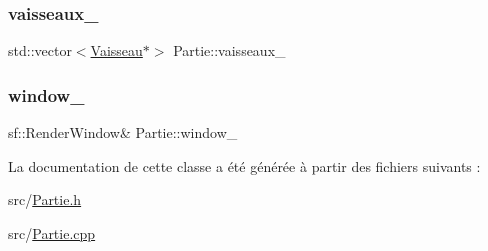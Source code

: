 \subsubsection{\texorpdfstring{vaisseaux\+\_\+}{vaisseaux\_}}
{\footnotesize\ttfamily std\+::vector$<$\hyperlink{class_vaisseau}{Vaisseau}$\ast$$>$ Partie\+::vaisseaux\+\_\+\hspace{0.3cm}{\ttfamily [protected]}}

\mbox{\label{class_partie_acb65cc46c340d6268679143aac50f8c0}} 
\subsubsection{\texorpdfstring{window\+\_\+}{window\_}}
{\footnotesize\ttfamily sf\+::\+Render\+Window\& Partie\+::window\+\_\+\hspace{0.3cm}{\ttfamily [protected]}}



La documentation de cette classe a été générée à partir des fichiers suivants \+:\begin{DoxyCompactItemize}
\item 
src/\hyperlink{_partie_8h}{Partie.\+h}\item 
src/\hyperlink{_partie_8cpp}{Partie.\+cpp}\end{DoxyCompactItemize}
